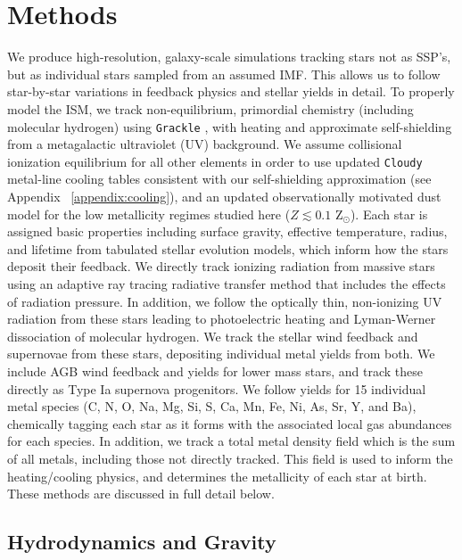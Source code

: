 \documentclass[twocolumn]{aastex61}
\begin{document}
\section{Methods}
\label{sec:methods}
We produce high-resolution, galaxy-scale simulations tracking stars not as SSP's, but as individual stars sampled from an assumed IMF.
This allows us to follow star-by-star variations in feedback physics and stellar yields in detail. To properly model the ISM, we track non-equilibrium, primordial chemistry (including molecular hydrogen) using \texttt{Grackle} \citep{GrackleMethod}, with heating and approximate self-shielding from a metagalactic ultraviolet (UV) background. We 
assume collisional ionization equilibrium for all other elements in order to
use updated \texttt{Cloudy} metal-line cooling tables consistent with our self-shielding approximation (see Appendix ~\ref{appendix:cooling}), and an updated observationally motivated dust model for the low metallicity regimes studied here ($Z \lesssim 0.1$ Z$_{\odot}$). Each star is assigned basic properties including surface gravity, effective temperature, radius, and lifetime from tabulated stellar evolution models, which inform how the stars deposit their feedback. We directly track ionizing radiation from massive stars using an adaptive ray tracing radiative transfer method that includes the effects of radiation pressure. In addition, we follow the optically thin, non-ionizing UV radiation from these stars leading to photoelectric heating and Lyman-Werner dissociation of molecular hydrogen. We track the stellar wind feedback and supernovae from these stars, depositing individual metal yields from both. We include AGB wind feedback and yields for lower mass stars, and track these directly as Type Ia supernova progenitors. We follow yields for 15 individual metal species (C, N, O, Na, Mg, Si, S, Ca, Mn, Fe, Ni, As, Sr, Y, and Ba), chemically tagging each star as it forms
with the associated local gas abundances for each species. In addition, we track a total metal density field which is the sum of all metals, including those not directly tracked. This field is used to inform the heating/cooling physics, and determines the metallicity of each star at birth. These methods are discussed in full detail below.

\subsection{Hydrodynamics and Gravity}
\label{sec:hydro}
\end{document}
